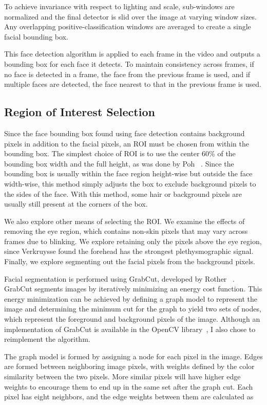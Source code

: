 \documentclass[10pt,twocolumn,letterpaper]{article}
\begin{document}
To achieve invariance with respect to lighting and scale, sub-windows are normalized and the final detector is slid over the image at varying window sizes. Any overlapping positive-classification windows are averaged to create a single facial bounding box.

This face detection algorithm is applied to each frame in the video and outputs a bounding box for each face it detects. To maintain consistency across frames, if no face is detected in a frame, the face from the previous frame is used, and if multiple faces are detected, the face nearest to that in the previous frame is used. 

\subsection{Region of Interest Selection}

Since the face bounding box found using face detection contains background pixels in addition to the facial pixels, an ROI must be chosen from within the bounding box. The simplest choice of ROI is to use the center 60\% of the bounding box width and the full height, as was done by Poh \etal~\cite{Poh:2010aa}. Since the bounding box is usually within the face region height-wise but outside the face width-wise, this method simply adjusts the box to exclude background pixels to the sides of the face. With this method, some hair or background pixels are usually still present at the corners of the box. 

We also explore other means of selecting the ROI. We examine the effects of removing the eye region, which contains non-skin pixels that may vary across frames due to blinking. We explore retaining only the pixels above the eye region, since Verkruysse \etal found the forehead has the strongest plethysmographic signal. Finally, we explore segmenting out the facial pixels from the background pixels.

Facial segmentation is performed using GrabCut, developed by Rother \etal~\cite{Rother:2004aa}. GrabCut segments images by iteratively minimizing an energy cost function. This energy minimization can be achieved by defining a graph model to represent the image and determining the minimum cut for the graph to yield two sets of nodes, which represent the foreground and background pixels of the image. Although an implementation of GrabCut is available in the OpenCV library~\cite{opencv_library}, I also chose to reimplement the algorithm.

The graph model is formed by assigning a node for each pixel in the image. Edges are formed between neighboring image pixels, with weights defined by the color similarity between the two pixels. More similar pixels will have higher edge weights to encourage them to end up in the same set after the graph cut. Each pixel has eight neighbors, and the edge weights between them are calculated as
\end{document}
